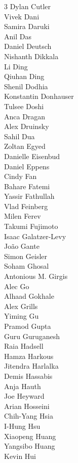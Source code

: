 \begin{multicols}{3}
Dylan Cutler \\ 
Vivek Dani \\ 
Samira Daruki \\ 
Anil Das \\ 
Daniel Deutsch \\ 
Nishanth Dikkala \\ 
Li Ding \\ 
Qiuhan Ding \\ 
Shenil Dodhia \\ 
Konstantin Donhauser \\ 
Tulsee Doshi \\ 
Anca Dragan \\ 
Alex Druinsky \\ 
Sahil Dua \\ 
Zoltan Egyed \\ 
Danielle Eisenbud \\ 
Daniel Eppens \\ 
Cindy Fan \\ 
Bahare Fatemi \\ 
Yassir Fathullah \\ 
Vlad Feinberg \\ 
Milen Ferev \\ 
Takumi Fujimoto \\ 
Isaac Galatzer-Levy \\ 
João Gante \\ 
Simon Geisler \\ 
Soham Ghosal \\ 
Antonious M. Girgis \\ 
Alec Go \\ 
Alhaad Gokhale \\ 
Alex Grills \\ 
Yiming Gu \\ 
Pramod Gupta \\ 
Guru Guruganesh \\ 
Raia Hadsell \\ 
Hamza Harkous \\ 
Jitendra Harlalka \\ 
Demis Hassabis \\ 
Anja Hauth \\ 
Joe Heyward \\ 
Arian Hosseini \\ 
Chih-Yang Hsia \\ 
I-Hung Hsu \\ 
Xiaopeng Huang \\ 
Yangsibo Huang \\ 
Kevin Hui \\ 

\end{multicols}
